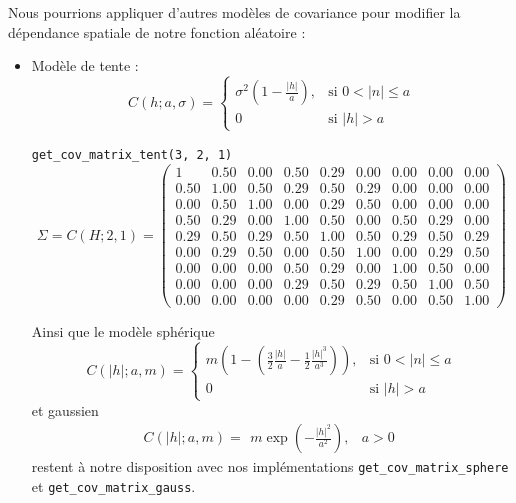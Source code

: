 \documentclass[10pt]{article} %
\begin{document}

Nous pourrions appliquer d'autres modèles de covariance pour modifier la dépendance spatiale de notre fonction aléatoire :

\begin{itemize}
    \item[] Modèle de tente :
    \[
        C(h; a, \sigma) = \left\{\begin{array}{lr}
            \sigma^2(1 - \frac{|h|}{a}), & \text{si } 0< |n|\leq a\\
            0 & \text{si } |h| > a
            \end{array}\right.
    \]

    \texttt{get\_cov\_matrix\_tent(3, 2, 1)}
    $$
    \Sigma = C(H; 2, 1) =
    \begin{pmatrix}
    1 & 0.50 & 0.00 & 0.50 & 0.29 & 0.00 & 0.00 & 0.00 & 0.00 \\
    0.50                       & 1.00 & 0.50 & 0.29 & 0.50 & 0.29 & 0.00 & 0.00 & 0.00 \\
    0.00                       & 0.50 & 1.00 & 0.00 & 0.29 & 0.50 & 0.00 & 0.00 & 0.00 \\
    0.50                       & 0.29 & 0.00 & 1.00 & 0.50 & 0.00 & 0.50 & 0.29 & 0.00 \\
    0.29                       & 0.50 & 0.29 & 0.50 & 1.00 & 0.50 & 0.29 & 0.50 & 0.29 \\
    0.00                       & 0.29 & 0.50 & 0.00 & 0.50 & 1.00 & 0.00 & 0.29 & 0.50 \\
    0.00                       & 0.00 & 0.00 & 0.50 & 0.29 & 0.00 & 1.00 & 0.50 & 0.00 \\
    0.00                       & 0.00 & 0.00 & 0.29 & 0.50 & 0.29 & 0.50 & 1.00 & 0.50 \\
    0.00                       & 0.00 & 0.00 & 0.00 & 0.29 & 0.50 & 0.00 & 0.50 & 1.00
    \end{pmatrix}
    $$

    Ainsi que le modèle sphérique
    \[
        C(|h|; a, m) = \left\{\begin{array}{lr}
            m(1 - (\frac{3}{2}\frac{|h|}{a} - \frac{1}{2}\frac{|h|^3}{a^3})), & \text{si } 0< |n|\leq a\\
            0 & \text{si } |h| > a
            \end{array}\right.
    \]et gaussien
    \[
        C(|h|; a, m) = \begin{array}{lr}
            m \exp (- \frac{|h|^2}{a^2}), & a > 0
            \end{array}
    \]
    restent à notre disposition avec nos implémentations \texttt{get\_cov\_matrix\_sphere} et
    \texttt{get\_cov\_matrix\_gauss}.

\end{itemize}
\end{document}
